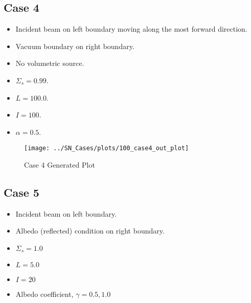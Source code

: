 \documentclass{NE515}
\theoremstyle{definition}
\begin{document}
    \subsection{Case 4}
    \begin{itemize}
        \item Incident beam on left boundary moving along the most forward direction.
        \item Vacuum boundary on right boundary.
        \item No volumetric source.
        \item $\Sigma_s=0.99$.
        \item $L=100.0$.
        \item $I=100$.
        \item $\alpha=0.5$.
    \end{itemize}

    \begin{figure}[!htb]
        \centering
        \texttt{[image: ../SN\_Cases/plots/100\_case4\_out\_plot]}
        \caption{Case 4 Generated Plot}
        \label{fig:case-4}
    \end{figure}
    \clearpage

    \subsection{Case 5}
    \begin{itemize}
        \item Incident beam on left boundary.
        \item Albedo (reflected) condition on right boundary.
        \item $\Sigma_s=1.0$
        \item $L=5.0$
        \item $I=20$
        \item Albedo coefficient, $\gamma=0.5,1.0$
    \end{itemize}
\end{document}
